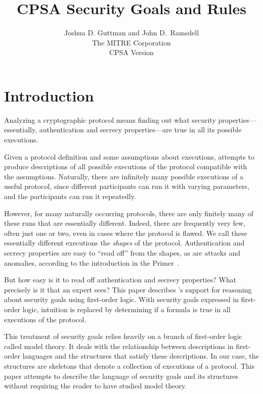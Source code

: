 \documentclass[12pt]{article}
\title{CPSA Security Goals and Rules}
\author{Joshua D. Guttman and John D.~Ramsdell\\
  The MITRE Corporation\\ CPSA Version \version}
\begin{document}
\maketitle
\cpsacopying

\tableofcontents

\newpage

\listoffigures

\listoftables

\newpage

\section{Introduction}

\begin{sloppypar}
Analyzing a cryptographic protocol means finding out what security
properties---essentially, authentication and secrecy properties---are
true in all its possible executions.
\end{sloppypar}

Given a protocol definition and some assumptions about executions,
{\cpsa} attempts to produce descriptions of all possible executions of
the protocol compatible with the assumptions.  Naturally, there are
infinitely many possible executions of a useful protocol, since
different participants can run it with varying parameters, and the
participants can run it repeatedly.

However, for many naturally occurring protocols, there are only
finitely many of these runs that are essentially different.  Indeed,
there are frequently very few, often just one or two, even in cases
where the protocol is flawed.  We call these essentially different
executions the \emph{shapes} of the protocol.  Authentication and
secrecy properties are easy to ``read off'' from the shapes, as are
attacks and anomalies, according to the introduction in the {\cpsa}
Primer~\cite{cpsaprimer09}.

But how easy is it to read off authentication and secrecy properties?
What precisely is it that an expert sees?  This paper describes
{\cpsa}'s support for reasoning about security goals using first-order
logic.  With security goals expressed in first-order logic, intuition
is replaced by determining if a formula is true in all executions of
the protocol.


This treatment of security goals relies heavily on a branch of
first-order logic called model theory.  It deals with the relationship
between descriptions in first-order languages and the structures that
satisfy these descriptions.  In our case, the structures are skeletons
that denote a collection of executions of a protocol.  This paper
attempts to describe the language of security goals and its
structures without requiring the reader to have studied model theory.
\end{document}
